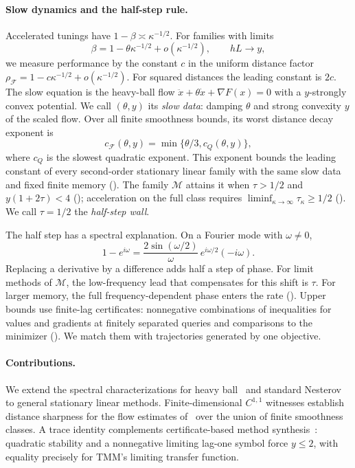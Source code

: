 \documentclass[11pt]{article}
\theoremstyle{definition}
\theoremstyle{remark}
\newcommand{\cF}{\mathcal F}
\newcommand{\cM}{\mathcal M}
\newcommand{\rhoF}{\rho_{\cF}}
\newcommand{\cQ}{c_{Q}}
\newcommand{\cFF}{c_{\cF}}
\begin{document}
\paragraph{Slow dynamics and the half-step rule.}
Accelerated tunings have \(1-\beta\asymp\kappa^{-1/2}\).  For families with limits
\begin{equation}\label{eq:scaling-intro}
\beta=1-\theta\kappa^{-1/2}+o(\kappa^{-1/2}),\qquad hL\to y,
\end{equation}
we measure performance by the constant \(c\) in the uniform distance factor
\(\rhoF=1-c\kappa^{-1/2}+o(\kappa^{-1/2})\).
For squared distances the leading constant is \(2c\).
The slow equation is the heavy-ball flow
\(\ddot x+\theta\dot x+\nabla F(x)=0\) with a \(y\)-strongly convex
potential.  We call \((\theta,y)\) its \emph{slow data}: damping \(\theta\) and
strong convexity \(y\) of the scaled flow.  Over all finite smoothness bounds,
its worst distance decay exponent is
\[
\cFF(\theta,y)=\min\{\theta/3,\cQ(\theta,y)\},
\]
where \(\cQ\) is the slowest quadratic exponent.
This exponent bounds the leading constant of every second-order stationary
linear family with the same slow data and fixed finite memory
().  The family \(\cM\) attains it when
\(\tau>1/2\) and \(y(1+2\tau)<4\) (); acceleration on the
full class requires \(\liminf_{\kappa\to\infty}\tau_\kappa\ge1/2\)
().  We call \(\tau=1/2\) the \emph{half-step wall}.

The half step has a spectral explanation.  On a Fourier mode with \(\omega\ne0\),
\[
1-e^{i\omega}
=\frac{2\sin(\omega/2)}{\omega}\,e^{i\omega/2}(-i\omega).
\]
Replacing a derivative by a difference adds half a step of phase.
For limit methods of \(\cM\), the low-frequency lead that compensates for this
shift is \(\tau\).
For larger memory, the full frequency-dependent phase enters the rate
().  Upper bounds use finite-lag certificates:
nonnegative combinations of inequalities for values and gradients at finitely
separated queries and comparisons to the minimizer ().
We match them with trajectories generated by one objective.

\paragraph{Contributions.}
We extend the spectral characterizations for heavy ball~\cite{TA} and standard
Nesterov~\cite{PS26} to general stationary linear methods.
Finite-dimensional \(C^{1,1}\) witnesses establish distance sharpness for the flow
estimates of~\cite{ADR22} over the union of finite smoothness classes.
A trace identity complements certificate-based method synthesis~\cite{LS20}: quadratic
stability and a nonnegative limiting lag-one symbol force \(y\le2\), with
equality precisely for TMM's limiting transfer function.
\end{document}
